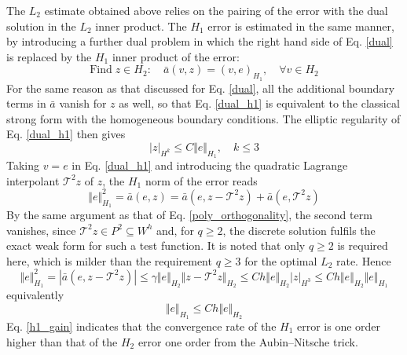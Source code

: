 The $L_2$ estimate obtained above relies on the pairing of the error with the dual solution in the $L_2$ inner product.
The $H_1$ error is estimated in the same manner, by introducing a further dual problem in which the right hand side of Eq. \eqref{dual} is replaced by the $H_1$ inner product of the error:
\begin{equation}\label{dual_h1}
	\textrm{Find}\; z\in H_2:\quad \bar a(v,z)=(v,e)_{H_1},\quad \forall v\in H_2
\end{equation}
For the same reason as that discussed for Eq. \eqref{dual}, all the additional boundary terms in $\bar a$ vanish for $z$ as well, so that Eq. \eqref{dual_h1} is equivalent to the classical strong form with the homogeneous boundary conditions.
The elliptic regularity \cite{} of Eq. \eqref{dual_h1} then gives
\begin{equation}\label{regularity_h1}
	\vert z \vert_{H^{k}}\le C\Vert e \Vert_{H_1},\quad k\le 3
\end{equation}
Taking $v=e$ in Eq. \eqref{dual_h1} and introducing the quadratic Lagrange interpolant $\mathcal T^{2}z$ of $z$, the $H_1$ norm of the error reads
\begin{equation}\label{h1_start}
	\Vert e \Vert_{H_1}^2=\bar a(e,z)=\bar a(e,z-\mathcal T^{2}z)+\bar a(e,\mathcal T^{2}z)
\end{equation}
By the same argument as that of Eq. \eqref{poly_orthogonality}, the second term vanishes, since $\mathcal T^{2}z\in P^2\subseteq W^h$ and, for $q\ge2$, the discrete solution fulfils the exact weak form for such a test function.
It is noted that only $q\ge2$ is required here, which is milder than the requirement $q\ge3$ for the optimal $L_2$ rate.
Hence
\begin{equation}\label{h1_estimate}
	\Vert e \Vert_{H_1}^2=\left|\bar a(e,z-\mathcal T^{2}z)\right|\le\gamma\Vert e \Vert_{H_2}\Vert z-\mathcal T^{2}z \Vert_{H_2}\le C h\Vert e \Vert_{H_2}\vert z \vert_{H^{3}}\le C h\Vert e \Vert_{H_2}\Vert e \Vert_{H_1}
\end{equation}
equivalently
\begin{equation}\label{h1_gain}
	\Vert e \Vert_{H_1}\le C h\Vert e \Vert_{H_2}
\end{equation}
Eq. \eqref{h1_gain} indicates that the convergence rate of the $H_1$ error is one order higher than that of the $H_2$ error one order from the Aubin--Nitsche trick.
